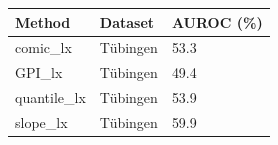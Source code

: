 \begin{tabular}{lll}
\toprule
Method & Dataset & AUROC (\%) \\
\midrule
comic\_lx & Tübingen & 53.3 \\
GPI\_lx & Tübingen & 49.4 \\
quantile\_lx & Tübingen & 53.9 \\
slope\_lx & Tübingen & 59.9 \\
\bottomrule
\end{tabular}
